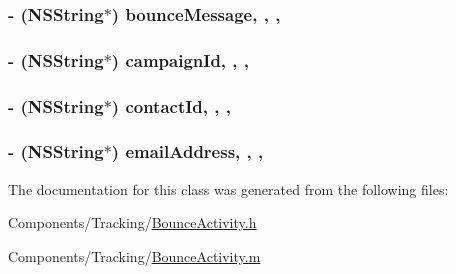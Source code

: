 \hypertarget{interface_bounce_activity_ada482cb4bacdb71831edf34f57cf5edf}{
\subsubsection[{bounce\-Message}]{\setlength{\rightskip}{0pt plus 5cm}-\/ (N\-S\-String$\ast$) bounce\-Message\hspace{0.3cm}{\ttfamily [read]}, {\ttfamily [write]}, {\ttfamily [nonatomic]}, {\ttfamily [strong]}}}\label{interface_bounce_activity_ada482cb4bacdb71831edf34f57cf5edf}
\hypertarget{interface_bounce_activity_a350e6393e579bbe9b4bc3fa513789049}{
\subsubsection[{campaign\-Id}]{\setlength{\rightskip}{0pt plus 5cm}-\/ (N\-S\-String$\ast$) campaign\-Id\hspace{0.3cm}{\ttfamily [read]}, {\ttfamily [write]}, {\ttfamily [nonatomic]}, {\ttfamily [strong]}}}\label{interface_bounce_activity_a350e6393e579bbe9b4bc3fa513789049}
\hypertarget{interface_bounce_activity_af8245514e78d4fb91e928a532045a834}{
\subsubsection[{contact\-Id}]{\setlength{\rightskip}{0pt plus 5cm}-\/ (N\-S\-String$\ast$) contact\-Id\hspace{0.3cm}{\ttfamily [read]}, {\ttfamily [write]}, {\ttfamily [nonatomic]}, {\ttfamily [strong]}}}\label{interface_bounce_activity_af8245514e78d4fb91e928a532045a834}
\hypertarget{interface_bounce_activity_afe1d492ae173849f08ebfff434948564}{
\subsubsection[{email\-Address}]{\setlength{\rightskip}{0pt plus 5cm}-\/ (N\-S\-String$\ast$) email\-Address\hspace{0.3cm}{\ttfamily [read]}, {\ttfamily [write]}, {\ttfamily [nonatomic]}, {\ttfamily [strong]}}}\label{interface_bounce_activity_afe1d492ae173849f08ebfff434948564}


The documentation for this class was generated from the following files\-:\begin{DoxyCompactItemize}
\item 
Components/\-Tracking/\hyperlink{_bounce_activity_8h}{Bounce\-Activity.\-h}\item 
Components/\-Tracking/\hyperlink{_bounce_activity_8m}{Bounce\-Activity.\-m}\end{DoxyCompactItemize}
